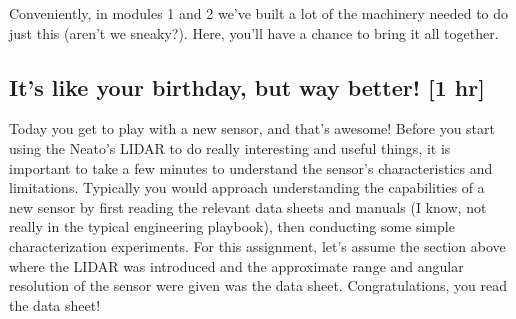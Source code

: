 \documentclass[M3_Night5_Solutions]{subfiles}
\begin{document}
Conveniently, in modules 1 and 2 we've built a lot of the machinery needed to do just this (aren't we sneaky?).  Here, you'll have a chance to bring it all together.

\subsection{It's like your birthday, but way better! [1 hr]}

Today you get to play with a new sensor, and that's awesome! Before you start using the Neato's LIDAR to do really interesting and useful things, it is important to take a few minutes to understand the sensor's characteristics and limitations. Typically you would approach understanding the capabilities of a new sensor by first reading the relevant data sheets and manuals (I know, not really in the typical engineering playbook), then conducting some simple characterization experiments. For this assignment, let's assume the section above where the LIDAR was introduced and the approximate range and angular resolution of the sensor were given was the data sheet. Congratulations, you read the data sheet!


\vspace{0.5cm}
\end{document}
